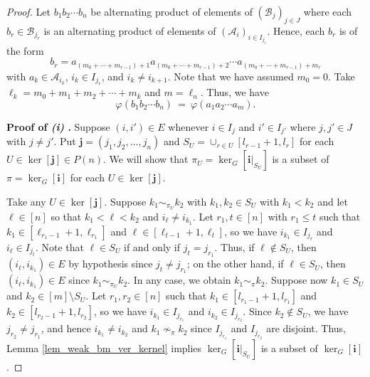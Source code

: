 \documentclass[10pt,a4paper]{amsart}
\begin{document}
\begin{proof}
	Let $b_1 b_2 \cdots b_n$ be alternating product of elements of  $(\mathcal{B}_j)_{j \in J}$ where each $b_r \in \mathcal{B}_{j_r}$ is an alternating product of elements of $(\mathcal{A}_i)_{i \in I_{j_r}}$.   
	Hence, each $b_r$ is of the form  
	\[b_r = a_{(m_0+\cdots+m_{r-1})+1} a_{(m_0+\cdots+m_{r-1})+2}   \cdots  a_{(m_0+\cdots+m_{r-1})+m_r} \]
	with $a_k \in \mathcal{A}_{i_k}$, $i_k \in I_{j_r}$, and $i_{k} \neq i_{k+1}$.   
	Note that we have assumed $m_0=0$.  
	Take $\ell_k = m_0 + m_1 + m_2 + \cdots + m_k$ and $m=\ell_n$. 
	Thus, we have %
	$$\varphi(b_1 b_2 \cdots b_n) \ = \ \varphi( a_1 a_2 \cdots a_{m} ).$$
	
	\noindent \textbf{Proof of \emph{(i)} .} Suppose $(i,i') \in E$ whenever $i \in I_{j}$ and $i' \in I_{j'}$ where $j,j' \in J$ with $j \neq j'$. 
	Put $\bm{j}=(j_1,j_2,\ldots,j_n)$ and $S_U = \cup_{r \in U}[l_{r-1}+1,l_r]$ for each $U \in \ker[\bm{j}] \in P(n)$. 
	We will show that $\pi_U = \ker_G[\bm{i}|_{S_U}]$ is a subset of $\pi = \ker_G[\bm{i}]$ for each $U \in \ker[\bm{j}]$. 
	
	Take any $U \in \ker[\bm{j}]$.
	Suppose $k_1 \sim_{\pi_U} k_2$ with $k_1 , k_2 \in S_U$ with $k_1 < k_2$ and let $\ell \in [n]$ so that $k_1 < \ell < k_2$ and $i_{\ell} \neq i_{k_1}$.  
	Let $r_1,t \in [n]$ with $r_1 \leq t$ such that $k_1 \in [\ell_{r_1-1}+1,\ell_{r_1}]$ and  $\ell \in [\ell_{t-1}+1,\ell_t]$, so we have $i_{k_1} \in I_{j_r}$ and $i_{\ell} \in I_{j_t}$. 
	Note that $\ell \in S_{U}$ if and only if $j_t = j_{r_1}$. 
	Thus, if $\ell \notin S_U$, then $(i_\ell,i_{k_1}) \in E$ by hypothesis since $j_t \neq j_{r_1}$; on the other hand, if $\ell \in S_U$, then $(i_\ell,i_{k_1}) \in E$ since $k_1 \sim_{\pi_U} k_2$. 
	In any case, we obtain $k_1 \sim_{\pi} k_2$. 
	Suppose now $k_1 \in S_U$ and $k_2 \in [m]\setminus S_U$.
	Let $r_1, r_2 \in [n]$ such that $k_1 \in [l_{r_1-1}+1,l_{r_1}] $ and $k_2 \in [l_{r_2-1}+1,l_{r_2}]$, so we have $i_{k_1} \in I_{j_{r_1}}$ and $i_{k_2} \in I_{j_{r_2}}$. 
	Since $k_2 \notin S_U$, we have $j_{r_2} \neq j_{r_1}$, and hence $i_{k_1} \neq i_{k_2}$ and $k_1 \nsim_{\pi} k_2$ since $I_{j_{r_1}}$ and $I_{j_{r_2}}$ are disjoint. 
	Thus, Lemma \ref{lem_weak_bm_ver_kernel} implies $\ker_G[\bm{i}|_{S_U}]$ is a subset of $\ker_G[\bm{i}]$. 
	

\end{proof}
\end{document}
